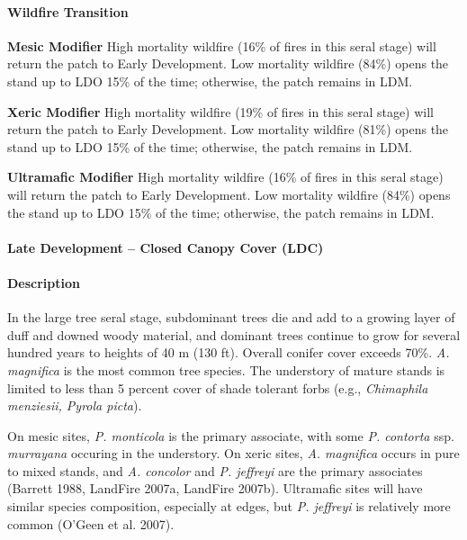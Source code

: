 \paragraph{Wildfire Transition}
\begin{adjustwidth}{2cm}{}
\noindent \textbf{Mesic Modifier } High mortality wildfire (16\% of fires in this seral stage) will return the patch to Early Development. Low mortality wildfire (84\%) opens the stand up to LDO 15\% of the time; otherwise, the patch remains in LDM. 

\medskip
\noindent \textbf{Xeric Modifier} High mortality wildfire (19\% of fires in this seral stage) will return the patch to Early Development. Low mortality wildfire (81\%) opens the stand up to LDO 15\% of the time; otherwise, the patch remains in LDM. 

\medskip
\noindent \textbf{Ultramafic Modifier} High mortality wildfire (16\% of fires in this seral stage) will return the patch to Early Development. Low mortality wildfire (84\%) opens the stand up to LDO 15\% of the time; otherwise, the patch remains in LDM.

\end{adjustwidth}

\noindent\hrulefill

\paragraph{Late Development – Closed Canopy Cover (LDC)}

\paragraph{Description} In the large tree seral stage, subdominant trees die and add to a growing layer of duff and downed woody material, and dominant trees continue to grow for several hundred years to heights of 40 m (130 ft). Overall conifer cover exceeds 70\%. \emph{A. magnifica} is the most common tree species. The understory of mature stands is limited to less than 5 percent cover of shade tolerant forbs (e.g., \emph{Chimaphila menziesii, Pyrola picta}). 

On mesic sites, \emph{P. monticola} is the primary associate, with some \emph{P. contorta} ssp. \emph{murrayana} occuring in the understory. On xeric sites, \emph{A. magnifica} occurs in pure to mixed stands, and \emph{A. concolor} and \emph{P. jeffreyi} are the primary associates (Barrett 1988, LandFire 2007a, LandFire 2007b). Ultramafic sites will have similar species composition, especially at edges, but \emph{P. jeffreyi} is relatively more common (O'Geen et al. 2007).


